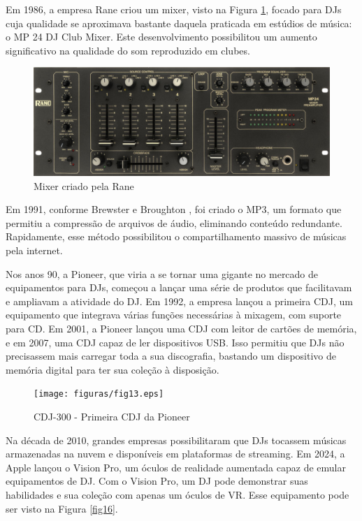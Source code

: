 Em 1986, a empresa Rane criou um mixer, visto na Figura \ref{fig15}, focado para DJs cuja qualidade se aproximava bastante daquela praticada em estúdios de música: o MP 24 DJ Club Mixer. Este desenvolvimento possibilitou um aumento significativo na qualidade do som reproduzido em clubes.

\begin{figure}[h]
	\centering
    \includegraphics[scale=0.3]{figuras/fig15.eps}
	\caption{Mixer criado pela Rane \cite{ranecommercialMixerEvolution}}
	\label{fig15}
\end{figure}

Em 1991, conforme Brewster e Broughton \cite{lastnight}, foi criado o MP3, um formato que permitiu a compressão de arquivos de áudio, eliminando conteúdo redundante. Rapidamente, esse método possibilitou o compartilhamento massivo de músicas pela internet.

Nos anos 90, a Pioneer, que viria a se tornar uma gigante no mercado de equipamentos para DJs, começou a lançar uma série de produtos que facilitavam e ampliavam a atividade do DJ. Em 1992, a empresa lançou a primeira CDJ, um equipamento que integrava várias funções necessárias à mixagem, com suporte para CD. Em 2001, a Pioneer lançou uma CDJ com leitor de cartões de memória, e em 2007, uma CDJ capaz de ler dispositivos USB. Isso permitiu que DJs não precisassem mais carregar toda a sua discografia, bastando um dispositivo de memória digital para ter sua coleção à disposição.

\begin{figure}[h]
	\centering
    \texttt{[image: figuras/fig13.eps]}
	\caption{CDJ-300 - Primeira CDJ da Pioneer \cite{cdj300}}
	\label{fig13}
\end{figure}

Na década de 2010, grandes empresas possibilitaram que DJs tocassem músicas armazenadas na nuvem e disponíveis em plataformas de streaming. Em 2024, a Apple lançou o Vision Pro, um óculos de realidade aumentada capaz de emular equipamentos de DJ. Com o Vision Pro, um DJ pode demonstrar suas habilidades e sua coleção com apenas um óculos de VR. Esse equipamento pode ser visto na Figura \ref{fig16}.

